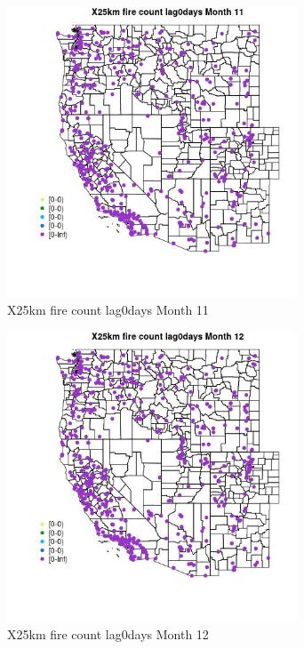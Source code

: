 \begin{figure} 
\centering  
\includegraphics[width=0.77\textwidth]{Code_Outputs/Report_ML_input_PM25_Step4_part_e_de_duplicated_aves_compiled_2019-05-14wNAs_MapObsMo11X25km_fire_count_lag0days.jpg} 
\caption{\label{fig:Report_ML_input_PM25_Step4_part_e_de_duplicated_aves_compiled_2019-05-14wNAsMapObsMo11X25km_fire_count_lag0days}X25km fire count lag0days Month 11} 
\end{figure} 
 

\begin{figure} 
\centering  
\includegraphics[width=0.77\textwidth]{Code_Outputs/Report_ML_input_PM25_Step4_part_e_de_duplicated_aves_compiled_2019-05-14wNAs_MapObsMo12X25km_fire_count_lag0days.jpg} 
\caption{\label{fig:Report_ML_input_PM25_Step4_part_e_de_duplicated_aves_compiled_2019-05-14wNAsMapObsMo12X25km_fire_count_lag0days}X25km fire count lag0days Month 12} 
\end{figure} 
 

